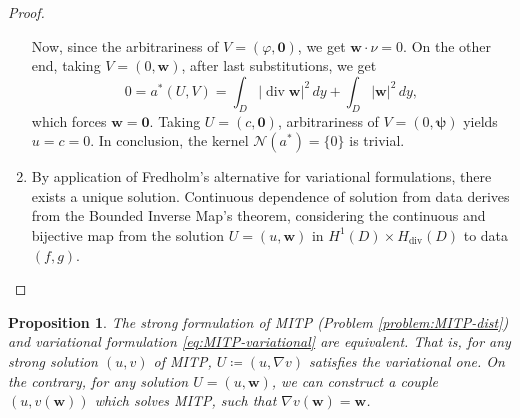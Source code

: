 \documentclass[10pt, a4paper, twoside, openright]{book}
\theoremstyle{definition}
\theoremstyle{plain}
\theoremstyle{plain}
\theoremstyle{plain}
\newtheorem{proposition}[subsection]{Proposition}
\theoremstyle{plain}
\theoremstyle{plain}
\theoremstyle{plain}
\theoremstyle{plain}
\theoremstyle{plain}
\DeclareMathOperator{\divergence}{div}
\let\phi\varphi
\begin{document}
\begin{proof}
\begin{enumerate}
 Now, since the arbitrariness of $V=(\phi, \bm 0)$, we get $\bm{w}\cdot\nu =0$.
 On the other end, taking $V=(0, \bm{w})$, after last substitutions, we get
\begin{equation*}
 0=a^*(U,V)=\int_D|\divergence \bm{w}|^2\,dy + \int_D|\bm{w}|^2\,dy,
\end{equation*}
which forces $\bm{w}=\bm{0}$. Taking $U=(c,\bm 0)$, arbitrariness of $V=(0,\bm \psi)$ yields $u=c=0$. 
In conclusion, the kernel $\mathcal{N}(a^*)=\{0\}$ is trivial.
\item By application of Fredholm's alternative for variational formulations, 
there exists a unique solution.
Continuous dependence of solution from data derives from the Bounded Inverse Map's theorem, considering the continuous and bijective map from the solution $U=(u,\bm w )$ in $H^1(D)\times H_{\divergence}(D)$ to data $(f,g)$.
\end{enumerate}
\end{proof}
\begin{proposition}
\label{prop:MITP-equivalence}
 The strong formulation of MITP (Problem \ref{problem:MITP-dist}) and variational formulation 
 \eqref{eq:MITP-variational} are equivalent.
 That is, for any strong solution $(u,v)$ of MITP, $U\coloneqq(u,\nabla v)$ satisfies the variational one. 
 On the contrary, for any solution $U=(u,\bm w)$, we can construct a couple $(u,v({\bm w}))$ 
 which solves MITP, such that $\nabla v(\bm w)=\bm w$.
\end{proposition}
\end{document}
